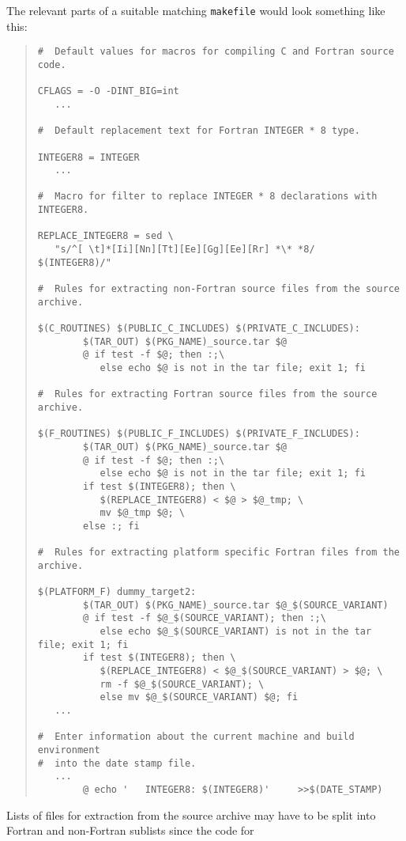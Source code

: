 \documentclass[twoside,11pt]{article}
\renewcommand{\_}{\texttt{\symbol{95}}}
\newcommand{\file}[1]{{\tt #1}}
\newenvironment{squote}{\begin{quote}\begin{small}}{\end{small}\end{quote}}
\begin{document}
The relevant parts of a suitable matching \file{makefile} would look
something like this:
\begin{squote}
\begin{verbatim}
#  Default values for macros for compiling C and Fortran source code.

CFLAGS = -O -DINT_BIG=int
   ...

#  Default replacement text for Fortran INTEGER * 8 type.

INTEGER8 = INTEGER
   ...

#  Macro for filter to replace INTEGER * 8 declarations with INTEGER8.

REPLACE_INTEGER8 = sed \
   "s/^[ \t]*[Ii][Nn][Tt][Ee][Gg][Ee][Rr] *\* *8/      $(INTEGER8)/"

#  Rules for extracting non-Fortran source files from the source archive.

$(C_ROUTINES) $(PUBLIC_C_INCLUDES) $(PRIVATE_C_INCLUDES):
        $(TAR_OUT) $(PKG_NAME)_source.tar $@
        @ if test -f $@; then :;\
           else echo $@ is not in the tar file; exit 1; fi

#  Rules for extracting Fortran source files from the source archive.

$(F_ROUTINES) $(PUBLIC_F_INCLUDES) $(PRIVATE_F_INCLUDES):
        $(TAR_OUT) $(PKG_NAME)_source.tar $@
        @ if test -f $@; then :;\
           else echo $@ is not in the tar file; exit 1; fi
        if test $(INTEGER8); then \
           $(REPLACE_INTEGER8) < $@ > $@_tmp; \
           mv $@_tmp $@; \
        else :; fi

#  Rules for extracting platform specific Fortran files from the archive.

$(PLATFORM_F) dummy_target2:
        $(TAR_OUT) $(PKG_NAME)_source.tar $@_$(SOURCE_VARIANT)
        @ if test -f $@_$(SOURCE_VARIANT); then :;\
           else echo $@_$(SOURCE_VARIANT) is not in the tar file; exit 1; fi
        if test $(INTEGER8); then \
           $(REPLACE_INTEGER8) < $@_$(SOURCE_VARIANT) > $@; \
           rm -f $@_$(SOURCE_VARIANT); \
           else mv $@_$(SOURCE_VARIANT) $@; fi
   ...

#  Enter information about the current machine and build environment
#  into the date stamp file.
   ...
        @ echo '   INTEGER8: $(INTEGER8)'     >>$(DATE_STAMP)
\end{verbatim}
\end{squote}
Lists of files for extraction from the source archive may have to
be split into Fortran and non-Fortran sublists since the code for
\end{document}
